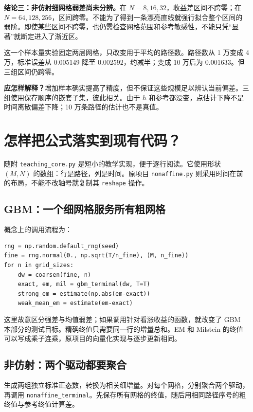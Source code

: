 \documentclass[11pt,a4paper,fontset=none]{ctexart}
\begin{document}
\textbf{结论三：非仿射细网格弱差尚未分辨。}在 $N=8,16,32$，收益差区间不跨零；在 $N=64,128,256$，区间跨零。不能为了得到一条漂亮直线就强行拟合整个区间的弱阶。即使某些区间不跨零，也仍需检查网格范围和参考敏感性，不能只凭“显著”就断定进入了渐近区。


这一个样本量实验固定两层网格，只改变用于平均的路径数。路径数从 1 万变成 4 万，标准误差从 0.005149 降至 0.002592，约减半；变成 10 万后为 0.001633。但三组区间仍跨零。

\textbf{应怎样解释？}增加样本确实提高了精度，但不保证这些规模足以辨认当前偏差。三组使用保存顺序的嵌套子集，彼此相关。由于 $h$ 和参考都没变，点估计下降不是时间离散偏差下降；10 万条路径的估计也不是真值。

\newpage
\section{怎样把公式落实到现有代码？}\label{sec:code}
随附 \texttt{teaching\_core.py} 是短小的教学实现，便于逐行阅读。它使用形状 $(M,N)$ 的数组：行是路径，列是时间。原项目 \texttt{nonaffine.py} 则采用时间在前的布局，不能不改轴号就复制其 \texttt{reshape} 操作。

\subsection*{GBM：一个细网格服务所有粗网格}
概念上的调用流程为：
\begin{lstlisting}
rng = np.random.default_rng(seed)
fine = rng.normal(0., np.sqrt(T/n_fine), (M, n_fine))
for n in grid_sizes:
    dw = coarsen(fine, n)
    exact, em, mil = gbm_terminal(dw, T=T)
    strong_em = estimate(np.abs(em-exact))
    weak_mean_em = estimate(em-exact)
\end{lstlisting}
这里故意区分强差与均值弱差；如果调用针对看涨收益的函数，就改变了 GBM 本部分的测试目标。精确终值只需要同一行的增量总和。EM 和 Milstein 的终值可以写成乘子连乘，原项目的向量化实现与逐步更新相同。

\subsection*{非仿射：两个驱动都要聚合}
生成两组独立标准正态数，转换为相关细增量。对每个网格，分别聚合两个驱动，再调用 \texttt{nonaffine\_\allowbreak terminal}。先保存所有网格的终值，随后用相同路径序号的粗终值与参考终值计算差。
\end{document}
